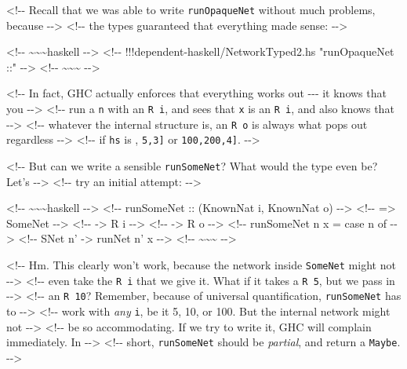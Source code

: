 \documentclass[]{article}
\begin{document}
\textless{}!-\/- Recall that we was able to write \texttt{runOpaqueNet} without
much problems, because -\/-\textgreater{} \textless{}!-\/- the types guaranteed
that everything made sense: -\/-\textgreater{}

\textless{}!-\/- \textasciitilde{}\textasciitilde{}\textasciitilde{}haskell
-\/-\textgreater{} \textless{}!-\/- !!!dependent-haskell/NetworkTyped2.hs
"runOpaqueNet ::" -\/-\textgreater{} \textless{}!-\/-
\textasciitilde{}\textasciitilde{}\textasciitilde{} -\/-\textgreater{}

\textless{}!-\/- In fact, GHC actually enforces that everything works out
-\/-\/- it knows that you -\/-\textgreater{} \textless{}!-\/- run a
\texttt{n\textquotesingle{}} with an \texttt{R\ i}, and sees that \texttt{x} is
an \texttt{R\ i}, and also knows that -\/-\textgreater{} \textless{}!-\/-
whatever the internal structure is, an \texttt{R\ o} is always what pops out
regardless -\/-\textgreater{} \textless{}!-\/- if \texttt{hs} is
\texttt{\textquotesingle{}{[}{]}}, \texttt{\textquotesingle{}{[}5,3{]}} or
\texttt{\textquotesingle{}{[}100,200,4{]}}. -\/-\textgreater{}

\textless{}!-\/- But can we write a sensible \texttt{runSomeNet}? What would the
type even be? Let's -\/-\textgreater{} \textless{}!-\/- try an initial attempt:
-\/-\textgreater{}

\textless{}!-\/- \textasciitilde{}\textasciitilde{}\textasciitilde{}haskell
-\/-\textgreater{} \textless{}!-\/- runSomeNet :: (KnownNat i, KnownNat o)
-\/-\textgreater{} \textless{}!-\/- =\textgreater{} SomeNet -\/-\textgreater{}
\textless{}!-\/- -\textgreater{} R i -\/-\textgreater{} \textless{}!-\/-
-\textgreater{} R o -\/-\textgreater{} \textless{}!-\/- runSomeNet n x = case n
of -\/-\textgreater{} \textless{}!-\/- SNet n' -\textgreater{} runNet n' x
-\/-\textgreater{} \textless{}!-\/-
\textasciitilde{}\textasciitilde{}\textasciitilde{} -\/-\textgreater{}

\textless{}!-\/- Hm. This clearly won't work, because the network inside
\texttt{SomeNet} might not -\/-\textgreater{} \textless{}!-\/- even take the
\texttt{R\ i} that we give it. What if it takes a \texttt{R\ 5}, but we pass in
-\/-\textgreater{} \textless{}!-\/- an \texttt{R\ 10}? Remember, because of
universal quantification, \texttt{runSomeNet} has to -\/-\textgreater{}
\textless{}!-\/- work with \emph{any} \texttt{i}, be it 5, 10, or 100. But the
internal network might not -\/-\textgreater{} \textless{}!-\/- be so
accommodating. If we try to write it, GHC will complain immediately. In
-\/-\textgreater{} \textless{}!-\/- short, \texttt{runSomeNet} should be
\emph{partial}, and return a \texttt{Maybe}. -\/-\textgreater{}
\end{document}
